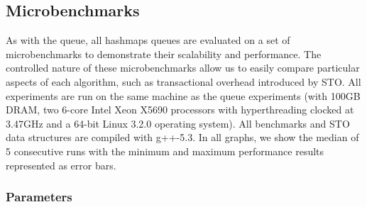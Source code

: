 \subsection{Microbenchmarks}
As with the queue, all hashmaps queues are evaluated on a set of microbenchmarks to demonstrate their scalability and performance. The controlled nature of these microbenchmarks allow us to easily compare particular aspects of each algorithm, such as transactional overhead introduced by STO. All experiments are run on the same machine as the queue experiments (with 100GB DRAM, two 6-core Intel Xeon X5690 processors with hyperthreading clocked at 3.47GHz and a 64-bit Linux 3.2.0 operating system). All benchmarks and STO data structures are compiled with g++-5.3. In all graphs, we show the median of 5 consecutive runs with the minimum and maximum performance results represented as error bars.

\subsubsection{Parameters}

